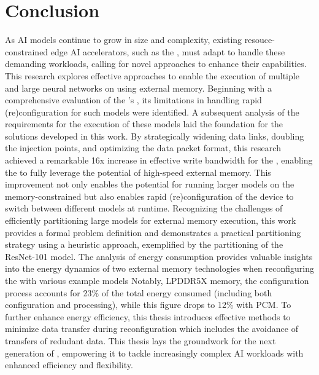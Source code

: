\section{Conclusion}
As AI models continue to grow in size and complexity, existing resouce-constrained edge AI accelerators, such as the \graicore{}, must adapt to handle these demanding workloads, calling for novel approaches to enhance their capabilities.
This research explores effective approaches to enable the execution of multiple and large neural networks on \graicore{} using external memory.
Beginning with a comprehensive evaluation of the \graicore{}'s \confignoc{}, its limitations in handling rapid (re)configuration for such models were identified.
A subsequent analysis of the requirements for the execution of these models laid the foundation for the solutions developed in this work.
By strategically widening data links, doubling the injection points, and optimizing the data packet format, this research achieved a remarkable 16x increase in effective write bandwidth for the \confignoc{}, enabling the \graicore{} to fully leverage the potential of high-speed external memory.
This improvement not only enables the potential for running larger models on the memory-constrained \graicore{} but also enables rapid (re)configuration of the device to switch between different models at runtime.
Recognizing the challenges of efficiently partitioning large models for external memory execution, this work provides a formal problem definition and demonstrates a practical partitioning strategy using a heuristic approach, exemplified by the partitioning of the ResNet-101 model.
The analysis of energy consumption provides valuable insights into the energy dynamics of two external memory technologies when reconfiguring the \graicore{} with various example models
Notably, LPDDR5X memory, the configuration process accounts for 23\% of the total energy consumed (including both configuration and processing), while this figure drops to 12\% with PCM.
To further enhance energy efficiency, this thesis introduces effective methods to minimize data transfer during reconfiguration which includes the avoidance of transfers of redudant data.
This thesis lays the groundwork for the next generation of \graicore{}, empowering it to tackle increasingly complex AI workloads with enhanced efficiency and flexibility.
